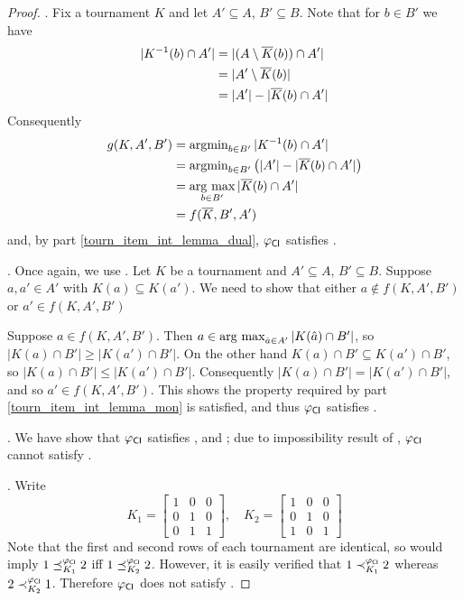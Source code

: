 \begin{proof}
    \dualaxiom{}. Fix a tournament $K$ and let $A' \subseteq A$, $B'
    \subseteq B$. Note that for $b \in B'$ we have
    \begin{align*}
        |K^{-1}(b) \cap A'|
        &= |(A \setminus {\overline{K}}(b)) \cap A'| \\
        &= |A' \setminus {\overline{K}}(b)| \\
        &= |A'| - |{\overline{K}}(b) \cap A'|
    \end{align*}
    Consequently
    \begin{align*}
        g(K, A', B')
        &= \operatorname{argmin}_{b \in B'}{|K^{-1}(b) \cap A'|} \\
        &= \operatorname{argmin}_{b \in B'}{\left(|A'| - |{\overline{K}}(b) \cap A'|\right)} \\
        &= \operatorname*{arg\ max}_{b \in B'}{|{\overline{K}}(b) \cap A'|} \\
        &= f({\overline{K}}, B', A')
    \end{align*}
    and, by  part
    \cref{tourn_item_int_lemma_dual}, ${\varphi_{\mathsf{CI}}}$ satisfies
    \dualaxiom{}.

    \mon{}. Once again, we use
    .  Let $K$ be a tournament and $A'
    \subseteq A$, $B' \subseteq B$. Suppose $a, a' \in A'$ with $K(a) \subseteq
    K(a')$. We need to show that either $a \not\in f(K, A', B')$ or $a' \in
    f(K, A', B')$

    Suppose $a \in f(K, A', B')$. Then $a \in \operatorname*{arg\ max}_{\hat{a} \in
    A'}{|K(\hat{a}) \cap B'|}$, so $|K(a) \cap B'| \ge |K(a') \cap B'|$. On the
    other hand $K(a) \cap B' \subseteq K(a') \cap B'$, so $|K(a) \cap B'| \le
    |K(a') \cap B'|$.  Consequently $|K(a) \cap B'| = |K(a') \cap B'|$, and so
    $a' \in f(K, A', B')$. This shows the property required by
     part
    \cref{tourn_item_int_lemma_mon} is satisfied, and thus ${\varphi_{\mathsf{CI}}}$
    satisfies \mon{}.

    \posresp{}. We have show that ${\varphi_{\mathsf{CI}}}$ satisfies
    \chaindef{}, \anon{} and \dualaxiom{}; due to
    impossibility result of , ${\varphi_{\mathsf{CI}}}$
    cannot satisfy \posresp{}.

    \iim{}. Write
    \[
        K_1 = \begin{bmatrix}
            1 & 0 & 0 \\
            0 & 1 & 0 \\
            0 & 1 & 1
        \end{bmatrix}
        , \quad
        K_2 = \begin{bmatrix}
            1 & 0 & 0 \\
            0 & 1 & 0 \\
            1 & 0 & 1
        \end{bmatrix}
    \]
    Note that the first and second rows of each tournament are identical, so
    \iim{} would imply $1 \preceq_{K_1}^{\varphi_{\mathsf{CI}}} 2$ iff $1
    \preceq_{K_2}^{\varphi_{\mathsf{CI}}} 2$.  However, it is easily verified that $1
    \prec_{K_1}^{\varphi_{\mathsf{CI}}} 2$ whereas $2 \prec_{K_2}^{\varphi_{\mathsf{CI}}} 1$. Therefore
    ${\varphi_{\mathsf{CI}}}$ does not satisfy \iim{}.
\end{proof}
